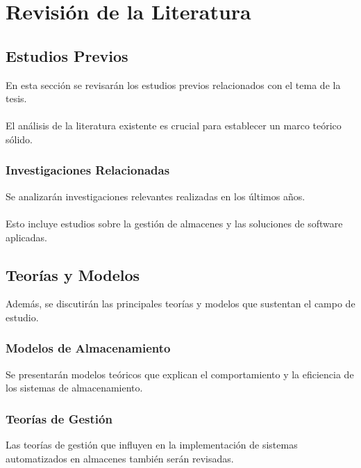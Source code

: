 \chapter{Revisión de la Literatura}

\section{Estudios Previos}
En esta sección se revisarán los estudios previos relacionados con el tema de la tesis.\\
\\
El análisis de la literatura existente es crucial para establecer un marco teórico sólido.

\subsection{Investigaciones Relacionadas}
Se analizarán investigaciones relevantes realizadas en los últimos años.\\
\\
Esto incluye estudios sobre la gestión de almacenes y las soluciones de software aplicadas.

\section{Teorías y Modelos}
Además, se discutirán las principales teorías y modelos que sustentan el campo de estudio.

\subsection{Modelos de Almacenamiento}
Se presentarán modelos teóricos que explican el comportamiento y la eficiencia de los sistemas de almacenamiento.

\subsection{Teorías de Gestión}
Las teorías de gestión que influyen en la implementación de sistemas automatizados en almacenes también serán revisadas.

